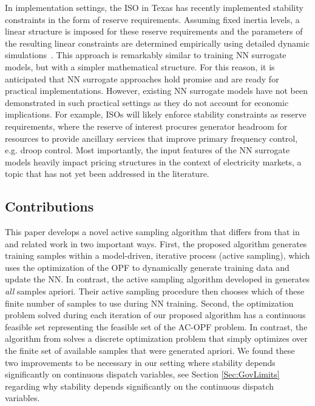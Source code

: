 \documentclass[lettersize,journal]{IEEEtran}
\begin{document}
In implementation settings, the ISO in Texas has recently implemented stability constraints in the form of reserve requirements.  Assuming fixed inertia levels, a linear structure is imposed for these reserve requirements and the parameters of the resulting linear constraints are determined empirically using detailed dynamic simulations~\cite{li2018design,liu2018participation}.  This approach is remarkably similar to training NN surrogate models, but with a simpler mathematical structure.  For this reason, it is anticipated that NN surrogate approaches hold promise and are ready for practical implementations.  However, existing NN surrogate models have not been demonstrated in such practical settings as they do not account for economic implications.  For example, ISOs will likely enforce stability constraints as reserve requirements, where the reserve of interest procures generator headroom for resources to provide ancillary services that improve primary frequency control, e.g. droop control. Most importantly, the input features of the NN surrogate models heavily impact pricing structures in the context of electricity markets, a topic that has not yet been addressed in the literature.


\subsection{Contributions}
This paper develops a novel active sampling algorithm that differs from that in~\cite{zhang2021encoding} and related work in two important ways.  First, the proposed algorithm generates training samples within a model-driven, iterative process (active sampling), which uses the optimization of the OPF to dynamically generate training data and update the NN.  In contrast, the active sampling algorithm developed in \cite{zhang2021encoding} generates \emph{all} samples apriori.  Their active sampling procedure then chooses which of these finite number of samples to use during NN training. Second, the optimization problem solved during each iteration of our proposed algorithm has a continuous feasible set representing the feasible set of the AC-OPF problem.  In contrast, the algorithm from \cite{zhang2021encoding} solves a discrete optimization problem that simply optimizes over the finite set of available samples that were generated apriori.  We found these two improvements to be necessary in our setting where stability depends significantly on continuous dispatch variables, see Section \ref{Sec:GovLimits} regarding why stability depends significantly on the continuous dispatch variables. 
\end{document}
